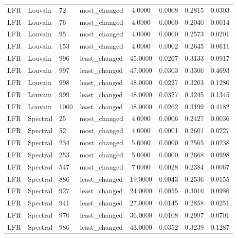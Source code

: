 \begin{longtable}{lllccccc}
LFR & Louvain & 72 & most\_changed & 4.0000 & 0.0008 & 0.2815 & 0.0303 \\
LFR & Louvain & 76 & most\_changed & 4.0000 & 0.0000 & 0.2040 & 0.0014 \\
LFR & Louvain & 95 & most\_changed & 4.0000 & 0.0000 & 0.2573 & 0.0201 \\
LFR & Louvain & 153 & most\_changed & 4.0000 & 0.0002 & 0.2645 & 0.0611 \\
LFR & Louvain & 996 & least\_changed & 45.0000 & 0.0267 & 0.3133 & 0.0917 \\
LFR & Louvain & 997 & least\_changed & 47.0000 & 0.0303 & 0.3306 & 0.4693 \\
LFR & Louvain & 998 & least\_changed & 48.0000 & 0.0227 & 0.3203 & 0.1280 \\
LFR & Louvain & 999 & least\_changed & 48.0000 & 0.0327 & 0.3245 & 0.1345 \\
LFR & Louvain & 1000 & least\_changed & 48.0000 & 0.0262 & 0.3199 & 0.4182 \\
LFR & Spectral & 25 & most\_changed & 4.0000 & 0.0006 & 0.2427 & 0.0036 \\
LFR & Spectral & 52 & most\_changed & 4.0000 & 0.0001 & 0.2601 & 0.0227 \\
LFR & Spectral & 234 & most\_changed & 5.0000 & 0.0000 & 0.2565 & 0.0238 \\
LFR & Spectral & 253 & most\_changed & 5.0000 & 0.0000 & 0.2668 & 0.0998 \\
LFR & Spectral & 547 & most\_changed & 7.0000 & 0.0028 & 0.2384 & 0.0067 \\
LFR & Spectral & 886 & least\_changed & 19.0000 & 0.0043 & 0.2536 & 0.0155 \\
LFR & Spectral & 927 & least\_changed & 24.0000 & 0.0055 & 0.3016 & 0.0986 \\
LFR & Spectral & 941 & least\_changed & 27.0000 & 0.0145 & 0.2858 & 0.0251 \\
LFR & Spectral & 970 & least\_changed & 36.0000 & 0.0108 & 0.2997 & 0.0701 \\
LFR & Spectral & 986 & least\_changed & 43.0000 & 0.0352 & 0.3239 & 0.1287 \\
\end{longtable}